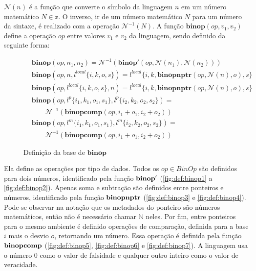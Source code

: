 $\mathcal{N}(n)$ é a função que converte o símbolo da linguagem $n$ em um número matemático $N \in \mathbb{z}$. O inverso, ir de um número matemático $N$ para um número da sintaxe, é realizado com a operação $\mathcal{N}^{-1}(N)$. A função $\mathbf{binop}(op, v_1, v_2)$ define a operação $op$ entre valores $v_1$ e $v_2$ da linguagem, sendo definido da seguinte forma:

\begin{figure}[ht]
	\begin{align}
		& \mathbf{binop}(op, n_1, n_2) = \mathcal{N}^{-1}(\mathbf{binop}'(op, \mathcal{N}(n_1), \mathcal{N}(n_2))) \\
		& \mathbf{binop}(op, n, l^{local}\{i, k, o, s\}) = l^{local}\{i, k, \mathbf{binopnptr}(op, \mathcal{N}(n), o), s\} \\
		& \mathbf{binop}(op, l^{local}\{i, k, o, s\}, n) = l^{local}\{i, k, \mathbf{binopnptr}(op, \mathcal{N}(n), o), s\} \\
		& \mathbf{binop}(op, l^p\{i_1, k_1, o_1, s_1\}, l^p\{i_2, k_2, o_2, s_2\}) = \nonumber \\ 
		&\quad\quad\mathcal{N}^{-1}(\mathbf{binopcomp}(op, i_1 + o_1, i_2 + o_2)) \\
		& \mathbf{binop}(op, l^m\{i_1, k_1, o_1, s_1\}, l^m\{i_2, k_2, o_2, s_2\}) = \nonumber \\ 
		&\quad\quad\mathcal{N}^{-1}(\mathbf{binopcomp}(op, i_1 + o_1, i_2 + o_2)) 
	\end{align}
	\caption{Definição da base de $\mathbf{binop}$}
	\label{fig:def:binop:base}
\end{figure}

Ela define as operações por tipo de dados. Todos os $op \in BinOp$ são definidos para dois números, identificado pela função $\mathbf{binop}'$ (\ref{fig:def:binop1} a \ref{fig:def:binop2}). Apenas soma e subtração são definidos entre ponteiros e números, identificado pela função $\mathbf{binopnptr}$ (\ref{fig:def:binop3} e \ref{fig:def:binop4}). Pode-se observar na notação que os metadados do ponteiro são números matemáticos, então não é necessário chamar $\mathbb{N}$ neles. Por fim, entre ponteiros para o mesmo ambiente é definido operações de comparação, definida para a base $i$ mais o desvio $o$, retornando um número. Essa operação é definida pela função $\mathbf{binopcomp}$ (\ref{fig:def:binop5}, \ref{fig:def:binop6} e \ref{fig:def:binop7}). A linguagem usa o número 0 como o valor de falsidade e qualquer outro inteiro como o valor de veracidade.

